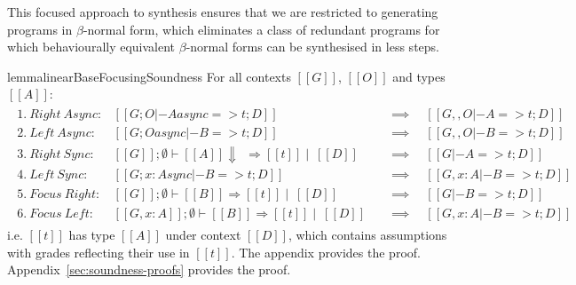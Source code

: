 This focused approach to synthesis ensures that we are restricted to generating
programs in $\beta$-normal form, which eliminates a class of redundant programs
for which behaviourally equivalent $\beta$-normal forms can be synthesised in
less steps.

\begin{restatable}{lemma}{linearBaseFocusingSoundness}
  For all contexts $[[ G ]]$, $[[ O ]]$ and types $[[ A ]]$:
  \begin{align*}
  \begin{array}{lll}
   1.\ Right\ Async: & [[ G ; O |- A async => t ; D ]] \quad &\implies \quad [[ G ,, O |- A => t ; D ]]\\
   2.\ Left\ Async: & [[ G ; O async |- B => t ; D ]] \quad &\implies \quad [[ G ,, O |- B => t ; D ]]\\
   3.\ Right\ Sync: & [[ G ]] ; \emptyset \vdash [[ A ]] \Downarrow\ \ \Rightarrow [[ t ]] \mid\  [[ D ]] \quad &\implies \quad [[ G |- A => t ; D ]]\\
   4.\ Left\ Sync: & [[ G ; {x : A} sync |- B => t ; D ]] \quad &\implies \quad [[ G, x : A |- B => t ; D ]]\\
   5.\ Focus\ Right: & [[ G ]] ; \emptyset \vdash [[ B]] \Rightarrow [[ t]] \mid\ [[ D ]] \quad &\implies \quad [[ G |- B => t ; D ]]\\
   6.\ Focus\ Left: & [[ G, x : A]] ; \emptyset \vdash [[ B]] \Rightarrow [[t ]] \mid\ [[ D ]] \quad &\implies \quad [[ G, x : A |- B => t ; D ]]
  \end{array}
  \end{align*}
i.e. $[[ t ]]$ has type $[[ A ]]$
under context $[[ D ]]$,
which contains assumptions with grades reflecting their use in $[[ t ]]$.
The appendix provides the proof.
Appendix~\ref{sec:soundness-proofs} provides the proof.
  \end{restatable}



